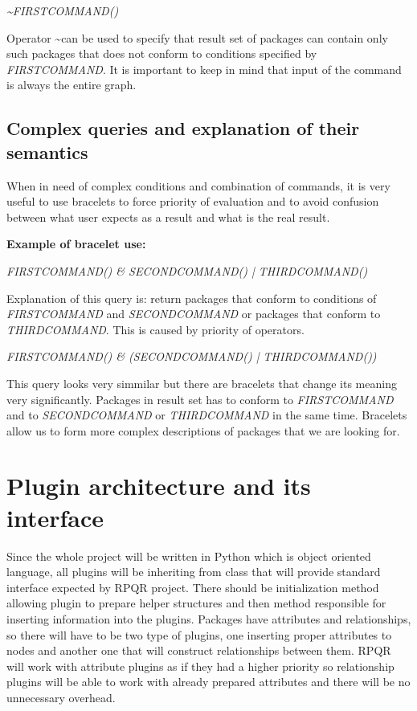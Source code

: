 \textit{\textasciitilde FIRSTCOMMAND()}

Operator \textasciitilde can be used to specify that result set of packages can contain only such
packages that does not conform to conditions specified by \textit{FIRSTCOMMAND}. It is important
to keep in mind that input of the command is always the entire graph.

\subsection*{Complex queries and explanation of their semantics}

When in need of complex conditions and combination of commands, it is very useful to use bracelets
to force priority of evaluation and to avoid confusion between what user expects as a result and
what is the real result.

\textbf{Example of bracelet use:}

\textit{FIRSTCOMMAND() \& SECONDCOMMAND() | THIRDCOMMAND()}

Explanation of this query is: return packages that conform to conditions of \textit{FIRSTCOMMAND}
and \textit{SECONDCOMMAND} or packages that conform to \textit{THIRDCOMMAND}. This is caused
by priority of operators.

\textit{FIRSTCOMMAND() \& (SECONDCOMMAND() | THIRDCOMMAND())}

This query looks very simmilar but there are bracelets that change its meaning very significantly.
Packages in result set has to conform to \textit{FIRSTCOMMAND} and to \textit{SECONDCOMMAND} or 
\textit{THIRDCOMMAND} in the same time. Bracelets allow us to form more complex descriptions of
packages that we are looking for.

\section{Plugin architecture and its interface}

Since the whole project will be written in Python which is object oriented language, all plugins
will be inheriting from class that will provide standard interface expected by RPQR project. There
should be initialization method allowing plugin to prepare helper structures and then method responsible
for inserting information into the plugins. Packages have attributes and relationships, so there 
will have to be two type of plugins, one inserting proper attributes to nodes and another one that
will construct relationships between them. RPQR will work with attribute plugins as if they had
a higher priority so relationship plugins will be able to work with already prepared attributes and
there will be no unnecessary overhead.

